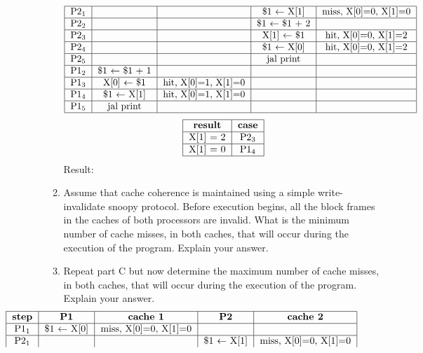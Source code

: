 \documentclass[10pt,letterpaper]{article}
\begin{document}
\begin{enumerate}[label=\textbf{Problem \arabic*.}]
\begin{enumerate}[label=\Alph*)]
\[\begin{tabular}{|c|c|c|c|c|}
	\hline
	P2$_1$ & & & \$1 $\leftarrow$ X[1] & miss, X[0]=0, X[1]=0 \\
	\hline
	P2$_2$ & & & \$1 $\leftarrow$ \$1 + 2 & \\
	\hline
	P2$_3$ & & & X[1] $\leftarrow$ \$1 & hit, X[0]=0, X[1]=2 \\
	\hline
	P2$_4$ & & & \$1 $\leftarrow$ X[0] & hit, X[0]=0, X[1]=2 \\
	\hline
	P2$_5$ & & & jal print & \\
	\hline
	P1$_2$ & \$1 $\leftarrow$ \$1 + 1 & & & \\
	\hline
	P1$_3$ & X[0] $\leftarrow$ \$1 & hit, X[0]=1, X[1]=0 & & \\
	\hline
	P1$_4$ & \$1 $\leftarrow$ X[1] & hit, X[0]=1, X[1]=0 & & \\
	\hline
	P1$_5$ & jal print & & & \\
	\hline
	\end{tabular}\]
	\[\begin{tabular}{|c|c|}
		\hline
		\textbf{result} & \textbf{case} \\
		\hline
		X[1] = 2 & P2$_3$ \\
		\hline
		X[1] = 0 & P1$_4$ \\
		\hline
		\end{tabular}\]
	Result: 
	\item Assume that cache coherence is maintained using a simple write-invalidate snoopy protocol. Before execution begins, all the block frames in the caches of both processors are invalid. What is the minimum number of cache misses, in both caches, that will occur during the execution of the program. Explain your answer.\\
	\item Repeat part C but now determine the maximum number of cache misses, in both caches, that will occur during the execution of the program. Explain your answer.
	\[\hspace*{-3cm}\begin{tabular}{|c|c|c|c|c|}
	\hline
	\textbf{step} & \textbf{P1} & \textbf{cache 1} & \textbf{P2} & \textbf{cache 2} \\
	\hline
	P1$_1$ & \$1 $\leftarrow$ X[0] & miss, X[0]=0, X[1]=0 & & \\
	\hline
	P2$_1$ & & & \$1 $\leftarrow$ X[1] & miss, X[0]=0, X[1]=0 \\

\end{tabular}\]
\end{enumerate}
\end{enumerate}
\end{document}
